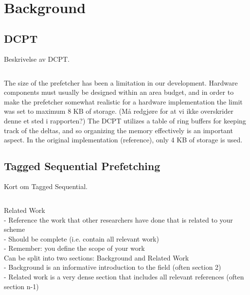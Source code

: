 \section{Background}

\subsection*{DCPT}
Beskrivelse av DCPT.

\subsection*{}
The size of the prefetcher has been a limitation in our development. Hardware components must usually be designed within an area budget, and in order to make the prefetcher somewhat realistic for a hardware implementation the limit was set to maximum 8 KB of storage. (Må redgjøre for at vi ikke overskrider denne et sted i rapporten?) The DCPT utilizes a table of ring buffers for keeping track of the deltas, and so organizing the memory effectively is an important aspect. In the original implementation (reference), only 4 KB of storage is used.

\subsection*{Tagged Sequential Prefetching}
Kort om Tagged Sequential.

\subsection*{}
Related Work\\
- Reference the work that other researchers have done 
that is related to your scheme\\
- Should be complete (i.e. contain all relevant work)\\
- Remember: you define the scope of your work\\
Can be split into two sections: Background and Related 
Work\\
- Background is an informative introduction to the field (often section 2)\\
- Related work is a very dense section that includes all relevant 
references (often section n-1)\\